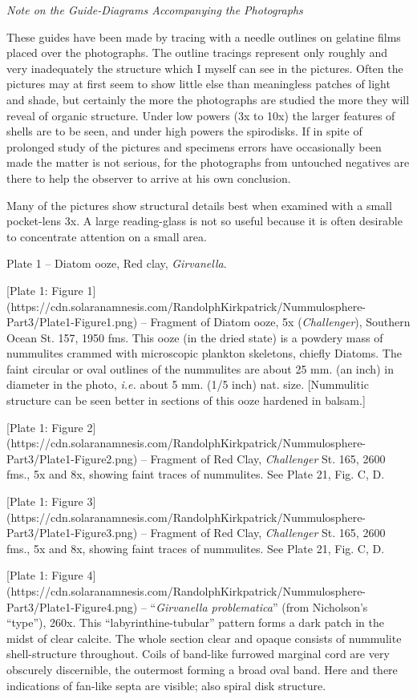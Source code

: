 \documentclass[a4paper, 12pt, oneside]{article}
\begin{document}
\emph{Note on the Guide-Diagrams Accompanying the Photographs}

These guides have been made by tracing with a needle outlines on gelatine films placed over the photographs. The outline tracings represent only roughly and very inadequately the structure which I myself can see in the pictures. Often the pictures may at first seem to show little else than meaningless patches of light and shade, but certainly the more the photographs are studied the more they will reveal of organic structure. Under low powers (3x to 10x) the larger features of shells are to be seen, and under high powers the spirodisks. If in spite of prolonged study of the pictures and specimens errors have occasionally been made the matter is not serious, for the photographs from untouched negatives are there to help the observer to arrive at his own conclusion.

Many of the pictures show structural details best when examined with a small pocket-lens 3x. A large reading-glass is not so useful because it is often desirable to concentrate attention on a small area.

Plate 1 -- Diatom ooze, Red clay, \emph{Girvanella}.

[Plate 1: Figure 1](https://cdn.solaranamnesis.com/RandolphKirkpatrick/Nummulosphere-Part3/Plate1-Figure1.png) -- Fragment of Diatom ooze, 5x (\emph{Challenger}), Southern Ocean St. 157, 1950 fms. This ooze (in the dried state) is a powdery mass of nummulites crammed with microscopic plankton skeletons, chiefly Diatoms. The faint circular or oval outlines of the nummulites are about 25 mm. (an inch) in diameter in the photo, \emph{i.e.} about 5 mm. (1/5 inch) nat. size. [Nummulitic structure can be seen better in sections of this ooze hardened in balsam.]

[Plate 1: Figure 2](https://cdn.solaranamnesis.com/RandolphKirkpatrick/Nummulosphere-Part3/Plate1-Figure2.png) -- Fragment of Red Clay, \emph{Challenger} St. 165, 2600 fms., 5x and 8x, showing faint traces of nummulites. See Plate 21, Fig. C, D.

[Plate 1: Figure 3](https://cdn.solaranamnesis.com/RandolphKirkpatrick/Nummulosphere-Part3/Plate1-Figure3.png) -- Fragment of Red Clay, \emph{Challenger} St. 165, 2600 fms., 5x and 8x, showing faint traces of nummulites. See Plate 21, Fig. C, D.

[Plate 1: Figure 4](https://cdn.solaranamnesis.com/RandolphKirkpatrick/Nummulosphere-Part3/Plate1-Figure4.png) -- ``\emph{Girvanella problematica}'' (from Nicholson's ``type''), 260x. This ``labyrinthine-tubular'' pattern forms a dark patch in the midst of clear calcite. The whole section clear and opaque consists of nummulite shell-structure throughout. Coils of band-like furrowed marginal cord are very obscurely discernible, the outermost forming a broad oval band. Here and there indications of fan-like septa are visible; also spiral disk structure.
\end{document}
